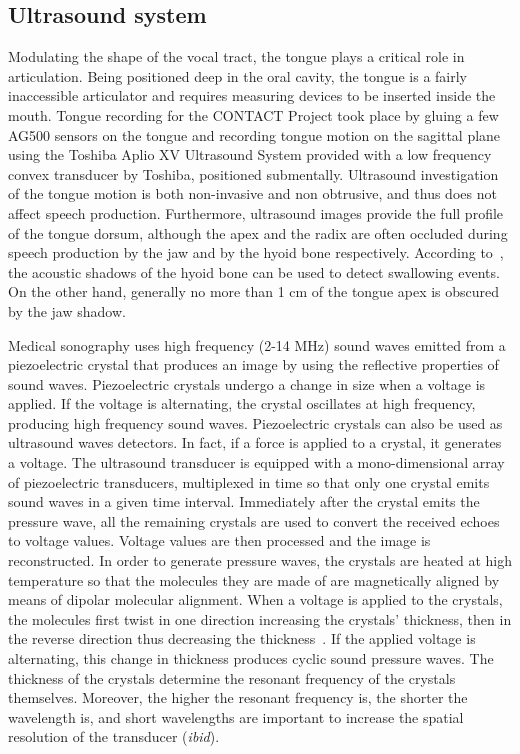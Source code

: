 \subsection{Ultrasound system}
\label{sec:linguometer:instrumentation:us}
Modulating the shape of the vocal tract, the tongue plays a critical role in
articulation.
Being positioned deep in the oral cavity, the tongue is a fairly inaccessible 
articulator and requires measuring devices to be inserted inside the mouth. 
Tongue recording for the CONTACT Project took place by gluing a few AG500
sensors on
the tongue and recording tongue motion on the sagittal plane using the Toshiba
Aplio XV Ultrasound System provided with a low frequency convex transducer by
Toshiba, positioned submentally.
Ultrasound investigation of the tongue motion is both non-invasive and non
obtrusive, and thus does not affect speech production.
Furthermore, ultrasound images provide the full profile of the tongue
dorsum, although the apex and the radix are often occluded during speech
production
by the jaw and by the hyoid bone respectively. 
According to~\citet{stone:2005}, the acoustic shadows of the hyoid bone can be
used to detect swallowing events.
On the other hand, generally no more than 1 cm of the tongue apex is obscured
by the jaw shadow.

Medical sonography uses high frequency (2-14 MHz) sound waves emitted from a
piezoelectric crystal that produces an image by using the reflective properties
of sound waves.
Piezoelectric crystals undergo a change in size when a voltage is applied.
If the voltage is alternating, the crystal oscillates at high frequency,
producing high frequency sound waves.
Piezoelectric crystals can also be used as ultrasound waves detectors. 
In fact, if a force is applied to a crystal, it generates a voltage.
The ultrasound transducer is equipped with a mono-dimensional array of
piezoelectric transducers, multiplexed in time so that only one crystal emits
sound waves in a given time interval. Immediately after the crystal emits the
pressure wave, all the remaining crystals are used to convert the received 
echoes to voltage values. Voltage values are then processed and the image
is reconstructed.
In order to generate pressure waves, the crystals are heated at high 
temperature so that the molecules they are made of are magnetically aligned  
by means of dipolar molecular alignment.
When a voltage is applied to the crystals, the molecules first twist in one
direction increasing the crystals' thickness, then in the reverse direction
thus decreasing the thickness~\citep{stone:2005}.
If the applied voltage is alternating, this change in 
thickness produces cyclic sound pressure waves.
The thickness of the crystals determine the resonant frequency of the crystals
themselves.
Moreover, the higher the resonant frequency is, the shorter the wavelength is,
and short wavelengths are important to increase the spatial resolution of the
transducer (\emph{ibid}).

